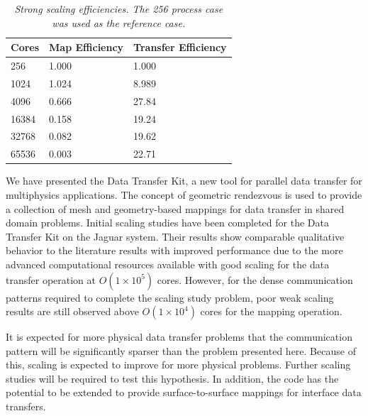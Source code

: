 \documentclass{mc2013}
\begin{document}
\begin{table}[htpb!]
  \begin{center}
    \begin{tabular}{lll}\hline\hline
      \multicolumn{1}{c}{Cores}& 
      \multicolumn{1}{c}{Map Efficiency} & 
      \multicolumn{1}{c}{Transfer Efficiency}\\\hline\hline
      256 &	1.000 &	1.000 \\
      1024 &	1.024 &	8.989 \\
      4096 &	0.666 &	27.84 \\
      16384 &	0.158 &	19.24 \\
      32768 &	0.082 &	19.62 \\
      65536 &	0.003 &	22.71 \\
      \hline\hline
    \end{tabular}
  \end{center}
  \caption{\sl Strong scaling efficiencies. The 256 process case was used
    as the reference case.}
  \label{tab:strong_efficiency}
\end{table}


We have presented the Data Transfer Kit, a new tool for parallel data
transfer for multiphysics applications. The concept of geometric
rendezvous is used to provide a collection of mesh and geometry-based
mappings for data transfer in shared domain problems. Initial scaling
studies have been completed for the Data Transfer Kit on the Jaguar
system. Their results show comparable qualitative behavior to the
literature results with improved performance due to the more advanced
computational resources available with good scaling for the data
transfer operation at $O(1 \times 10^5)$ cores. However, for the dense
communication patterns required to complete the scaling study problem,
poor weak scaling results are still observed above $O(1 \times 10^4)$
cores for the mapping operation.

It is expected for more physical data transfer problems that the
communication pattern will be significantly sparser than the problem
presented here. Because of this, scaling is expected to improve for
more physical problems. Further scaling studies will be required to
test this hypothesis. In addition, the code has the potential to be
extended to provide surface-to-surface mappings for interface data
transfers.


\end{document}
